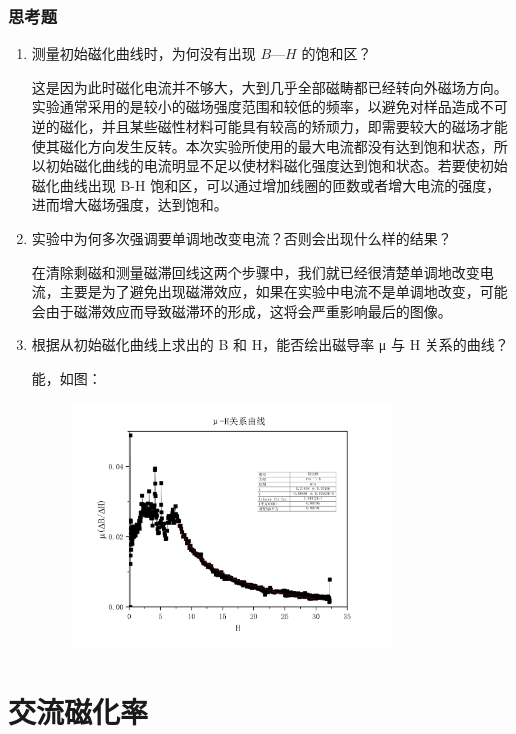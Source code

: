 \documentclass[a4paper,utf8]{article}
\begin{document}
\section{思考题}
    \begin{enumerate}
        \item 测量初始磁化曲线时，为何没有出现 $B—H$ 的饱和区？\par
            这是因为此时磁化电流并不够大，大到几乎全部磁畴都已经转向外磁场方向。实验通常采用的是较小的磁场强度范围和较低的频率，以避免对样品造成不可逆的磁化，并且某些磁性材料可能具有较高的矫顽力，即需要较大的磁场才能使其磁化方向发生反转。本次实验所使用的最大电流都没有达到饱和状态，所以初始磁化曲线的电流明显不足以使材料磁化强度达到饱和状态。若要使初始磁化曲线出现 B-H 饱和区，可以通过增加线圈的匝数或者增大电流的强度，进而增大磁场强度，达到饱和。
        \item 实验中为何多次强调要单调地改变电流？否则会出现什么样的结果？\par
            在清除剩磁和测量磁滞回线这两个步骤中，我们就已经很清楚单调地改变电流，主要是为了避免出现磁滞效应，如果在实验中电流不是单调地改变，可能会由于磁滞效应而导致磁滞环的形成，这将会严重影响最后的图像。
        \item 根据从初始磁化曲线上求出的 B 和 H，能否绘出磁导率 μ 与 H 关系的曲线？\par
            能，如图：
            \begin{figure}[!ht]
                \includegraphics[width=0.8\textwidth]{fig6.pdf}
            \end{figure}
    \end{enumerate}
\part{交流磁化率}
\setcounter{section}{0}
\end{document}
